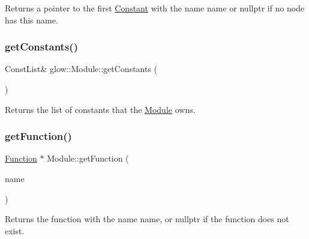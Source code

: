 \begin{DoxyReturn}{Returns}
a pointer to the first \hyperlink{classglow_1_1_constant}{Constant} with the name {\ttfamily name} or nullptr if no node has this name. 
\end{DoxyReturn}
\mbox{\label{classglow_1_1_module_a07faea735d56effc579009af4a5c0a77}} 
\subsubsection{\texorpdfstring{get\+Constants()}{getConstants()}}
{\footnotesize\ttfamily Const\+List\& glow\+::\+Module\+::get\+Constants (\begin{DoxyParamCaption}{ }\end{DoxyParamCaption})\hspace{0.3cm}{\ttfamily [inline]}}

\begin{DoxyReturn}{Returns}
the list of constants that the \hyperlink{classglow_1_1_module}{Module} owns. 
\end{DoxyReturn}
\mbox{\label{classglow_1_1_module_a3c3312d6bcf9f805037de85a0aee0e39}} 
\subsubsection{\texorpdfstring{get\+Function()}{getFunction()}}
{\footnotesize\ttfamily \hyperlink{classglow_1_1_function}{Function} $\ast$ Module\+::get\+Function (\begin{DoxyParamCaption}\item[{llvm\+::\+String\+Ref}]{name }\end{DoxyParamCaption})}

\begin{DoxyReturn}{Returns}
the function with the name {\ttfamily name}, or nullptr if the function does not exist. 
\end{DoxyReturn}
\mbox{\label{classglow_1_1_module_a88ea3d6d180c7bc843e5258ca625a416}} 
